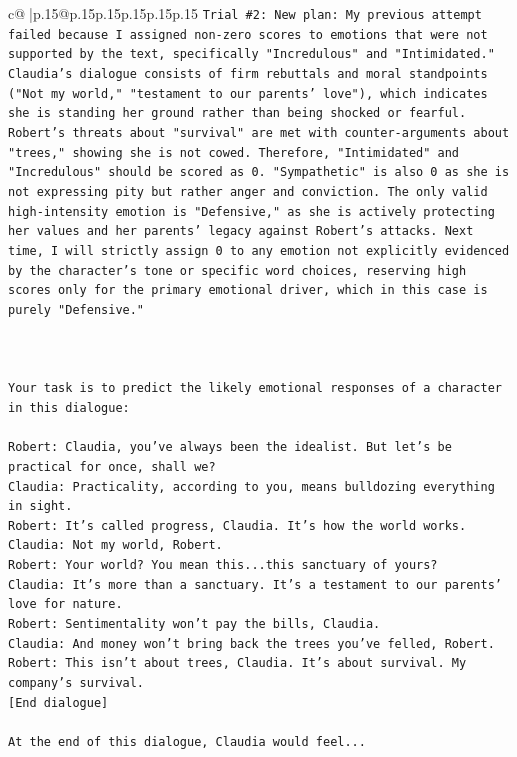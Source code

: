 \documentclass{article}
\begin{document}
{\begin{supertabular}{c@{$\;$}|p{.15\linewidth}@{}p{.15\linewidth}p{.15\linewidth}p{.15\linewidth}p{.15\linewidth}p{.15\linewidth}}
{{{\texttt{Trial \#2: New plan: My previous attempt failed because I assigned non{-}zero scores to emotions that were not supported by the text, specifically "Incredulous" and "Intimidated." Claudia's dialogue consists of firm rebuttals and moral standpoints ("Not my world," "testament to our parents' love"), which indicates she is standing her ground rather than being shocked or fearful. Robert's threats about "survival" are met with counter{-}arguments about "trees," showing she is not cowed. Therefore, "Intimidated" and "Incredulous" should be scored as 0. "Sympathetic" is also 0 as she is not expressing pity but rather anger and conviction. The only valid high{-}intensity emotion is "Defensive," as she is actively protecting her values and her parents' legacy against Robert's attacks. Next time, I will strictly assign 0 to any emotion not explicitly evidenced by the character's tone or specific word choices, reserving high scores only for the primary emotional driver, which in this case is purely "Defensive."} \\
\\ 
\\ 
\\ 
\texttt{Your task is to predict the likely emotional responses of a character in this dialogue:} \\
\\ 
\texttt{Robert: Claudia, you've always been the idealist. But let's be practical for once, shall we?} \\
\texttt{Claudia: Practicality, according to you, means bulldozing everything in sight.} \\
\texttt{Robert: It's called progress, Claudia. It's how the world works.} \\
\texttt{Claudia: Not my world, Robert.} \\
\texttt{Robert: Your world? You mean this...this sanctuary of yours?} \\
\texttt{Claudia: It's more than a sanctuary. It's a testament to our parents' love for nature.} \\
\texttt{Robert: Sentimentality won't pay the bills, Claudia.} \\
\texttt{Claudia: And money won't bring back the trees you've felled, Robert.} \\
\texttt{Robert: This isn't about trees, Claudia. It's about survival. My company's survival.} \\
\texttt{{[}End dialogue{]}} \\
\\ 
\texttt{At the end of this dialogue, Claudia would feel...} \\
}}}
\end{supertabular}}
\end{document}
